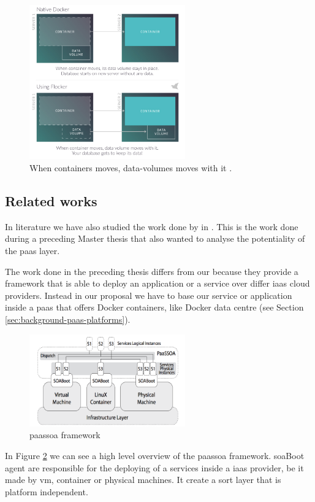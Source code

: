 \begin{figure}
	\centering{}
	\includegraphics[width=0.6\textwidth]{chapters/architecture/images/flocker.png}
	\caption[Flocker capabilities]{When containers moves, data-volumes moves with it \cite{flockerHomepage}.}
	\label{img:architecture-proposal-architecture-multiTenancy-Flocker}
\end{figure}

\subsection{Related works}
\label{sec:architecture-related}
In literature we have also studied the work done by \citeauthor{baraldo2015reconciling} in
\cite{baraldo2015reconciling}. This is the work done during a preceding Master thesis that also wanted
to analyse the potentiality of the \ac{paas} layer.

The work done in the preceding thesis differs from our because they provide a framework that is able
to deploy an application or a service over differ \ac{iaas} cloud providers. Instead in our proposal
we have to base our service or application inside a \ac{paas} that offers Docker containers, like
Docker data centre (see Section \ref{sec:background-paas-platforms}).

\begin{figure}
	\centering{}
	\includegraphics[width=0.6\textwidth]{chapters/architecture/images/passsoa.png}
	\caption[\acs{paas}\acs{soa} framework]{\acs{paas}\acs{soa} framework \cite{baraldo2015reconciling}}
	\label{img:architecture-proposal-related}
\end{figure}

In Figure \ref{img:architecture-proposal-related} we can see a high level overview of the \ac{paas}\ac{soa}
framework. \ac{soa}Boot agent are responsible for the deploying of a services inside a \ac{iaas} provider,
be it made by \ac{vm}, container or physical machines. It create a sort layer that is platform
independent.
